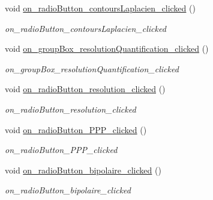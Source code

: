 \begin{DoxyCompactItemize}
\mbox{\label{classMainWindow_a1d04ac03f359e95a2abb371f0f0d82e1}} 
void \hyperlink{classMainWindow_a1d04ac03f359e95a2abb371f0f0d82e1}{on\+\_\+radio\+Button\+\_\+contours\+Laplacien\+\_\+clicked} ()
\begin{DoxyCompactList}\small\item\em on\+\_\+radio\+Button\+\_\+contours\+Laplacien\+\_\+clicked \end{DoxyCompactList}\item 
\mbox{\label{classMainWindow_ae9b4e5c812b35987f1e188dc5f4ad534}} 
void \hyperlink{classMainWindow_ae9b4e5c812b35987f1e188dc5f4ad534}{on\+\_\+group\+Box\+\_\+resolution\+Quantification\+\_\+clicked} ()
\begin{DoxyCompactList}\small\item\em on\+\_\+group\+Box\+\_\+resolution\+Quantification\+\_\+clicked \end{DoxyCompactList}\item 
\mbox{\label{classMainWindow_a89fcd1468300d25c34b6c35188e8dd52}} 
void \hyperlink{classMainWindow_a89fcd1468300d25c34b6c35188e8dd52}{on\+\_\+radio\+Button\+\_\+resolution\+\_\+clicked} ()
\begin{DoxyCompactList}\small\item\em on\+\_\+radio\+Button\+\_\+resolution\+\_\+clicked \end{DoxyCompactList}\item 
\mbox{\label{classMainWindow_a0f6b5671436b52118a5758c15a3735c2}} 
void \hyperlink{classMainWindow_a0f6b5671436b52118a5758c15a3735c2}{on\+\_\+radio\+Button\+\_\+\+P\+P\+P\+\_\+clicked} ()
\begin{DoxyCompactList}\small\item\em on\+\_\+radio\+Button\+\_\+\+P\+P\+P\+\_\+clicked \end{DoxyCompactList}\item 
\mbox{\label{classMainWindow_a130c57540974796d0d852500b5e8bf17}} 
void \hyperlink{classMainWindow_a130c57540974796d0d852500b5e8bf17}{on\+\_\+radio\+Button\+\_\+bipolaire\+\_\+clicked} ()
\begin{DoxyCompactList}\small\item\em on\+\_\+radio\+Button\+\_\+bipolaire\+\_\+clicked \end{DoxyCompactList}\item 

\end{DoxyCompactItemize}
